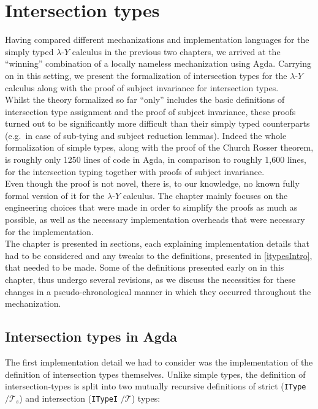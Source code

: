 \documentclass[a4paper, 12pt, twoside]{style/ociamthesis}
\theoremstyle{plain}
\theoremstyle{definition}
\theoremstyle{remark}
\newcommand{\lamy}{\lambda\text{-}Y}
\begin{document}
\newpage

\chapter{Intersection types}\label{intersection-types-1}

\label{chap:itypes}

Having compared different mechanizations and implementation languages
for the simply typed \(\lamy\) calculus in the previous two chapters, we
arrived at the ``winning'' combination of a locally nameless
mechanization using Agda. Carrying on in this setting, we present the
formalization of intersection types for the \(\lamy\) calculus along
with the proof of subject invariance for intersection types.\\
Whilst the theory formalized so far ``only'' includes the basic
definitions of intersection type assignment and the proof of subject
invariance, these proofs turned out to be significantly more difficult
than their simply typed counterparts (e.g.~in case of sub-tying and
subject reduction lemmas). Indeed the whole formalization of simple
types, along with the proof of the Church Rosser theorem, is roughly
only 1250 lines of code in Agda, in comparison to roughly 1,600 lines,
for the intersection typing together with proofs of subject
invariance.\\
Even though the proof is not novel, there is, to our knowledge, no known
fully formal version of it for the \(\lamy\) calculus. The chapter
mainly focuses on the engineering choices that were made in order to
simplify the proofs as much as possible, as well as the necessary
implementation overheads that were necessary for the implementation.\\
The chapter is presented in sections, each explaining implementation
details that had to be considered and any tweaks to the definitions,
presented in \cref{itypesIntro}, that needed to be made. Some of the
definitions presented early on in this chapter, thus undergo several
revisions, as we discuss the necessities for these changes in a
pseudo-chronological manner in which they occurred throughout the
mechanization.

\section{Intersection types in Agda}\label{intersection-types-in-agda}

\label{itypesAgda}

The first implementation detail we had to consider was the
implementation of the definition of intersection types themselves.
Unlike simple types, the definition of intersection-types is split into
two mutually recursive definitions of strict (\texttt{IType}
\(/\mathcal{T}_s\)) and intersection (\texttt{ITypeI} \(/\mathcal{T}\))
types:
\end{document}
